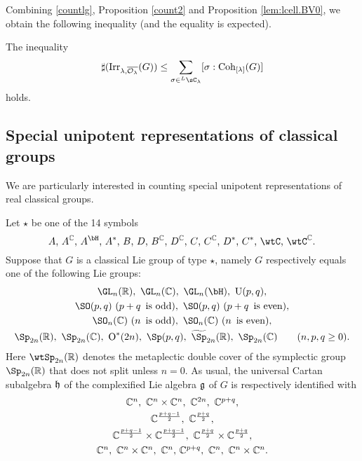 \documentclass[counting_main.tex]{subfiles}
\begin{document}
 Combining \eqref{countlg}, Proposition \ref{count2} and Proposition
 \ref{lem:lcell.BV0}, we obtain the following inequality (and the equality is
 expected).

 \begin{cor}
   The inequality
   \begin{equation}\label{boundc}
     \sharp(\Irr_{\lambda,\overline{\CO_\lambda}}(G)) \leq \sum_{\sigma\in \LC_\lambda} [\sigma: \Coh_{\Lam}(G)]
   \end{equation}
   holds.
 \end{cor}



 \subsection{Special unipotent representations of classical groups}

 We are particularly interested in counting special unipotent representations of
 real classical groups.

 Let $\star$ be one of the 14 symbols
 \[
   \textrm{ $A$, $A^\C$, $A^\bH$, $A^*$, $B$, $D$, $B^\C$, $D^\C$, $C$, $C^\C$,
     $D^*$, $C^*$, $\wtC$, $\wtC^\C$. }
 \]
 Suppose that $G$ is a classical Lie group of type $\star$, namely $G$
 respectively equals one of the following Lie groups:
 \[
   \begin{array}{c}
     \GL_n(\R), \ \GL_n(\C), \  \GL_n(\bH),\  \oU(p,q),\smallskip\\
     \SO(p,q)\ (p+q\, \textrm{ is odd}),  \  \SO(p,q)\  (p+q\, \textrm{ is even}),\smallskip\\
     \SO_n(\C) \ (n\, \textrm{ is odd}),  \
     \SO_n(\C) \ (n\, \textrm{ is even}),\smallskip \\
     \Sp_{2n}(\R), \ \Sp_{2n}(\C), \  \oO^*(2n), \  \Sp(p,q),\   \widetilde \Sp_{2n}(\R), \ \Sp_{2n}(\C) \qquad (n, p, q\geq 0).
   \end{array}
 \]
 Here $\wtSp_{2n}(\R)$ denotes the metaplectic double cover of the symplectic
 group $\Sp_{2n}(\R)$ that does not split unless $n=0$. As usual, the universal
 Cartan subalgebra $\mathfrak h$ of the complexified Lie algebra $\mathfrak g$ of $G$ is
 respectively identified with
 \[
   \begin{array}{c}
     \C^n, \ \C^n\times \C^n, \ \C^{2n},  \ \C^{p+q},\smallskip \\
     \C^{\frac{p+q-1}{2}},\ \C^{\frac{p+q}{2}}, \smallskip \\
     \C^{\frac{p+q-1}{2}}\times \C^{\frac{p+q-1}{2}},\  \C^{\frac{p+q}{2}}\times \C^{\frac{p+q}{2}}, \smallskip \\
     \C^n,\ \C^n\times \C^n, \ \C^n, \, \C^{p+q},   \ \C^n,\ \C^n\times \C^n.
   \end{array}
 \]
\end{document}
